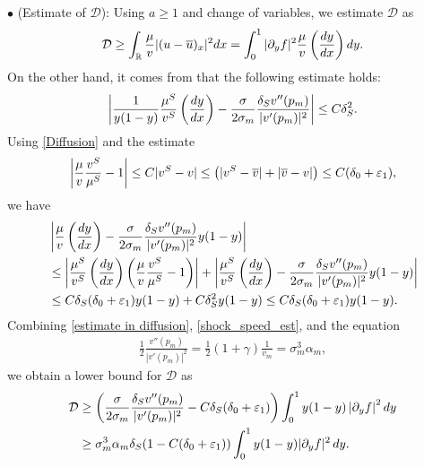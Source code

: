 \documentclass[11pt,reqno]{amsart}
\begin{document}
	
	\noindent $\bullet$ (Estimate of $\mathcal{D}$):
	Using $a \geq 1$ and change of variables, we estimate $\mathcal{D}$ as
	\begin{equation*}
	\mathcal{D} \geq  \int_{\mathbb{R}} \frac{\mu}{v}|(u-\overline{u})_x|^2 dx=\int_0^1 |\partial_y f|^2 \frac{\mu}{v} \left(\frac{dy}{d x} \right) dy.
	\end{equation*}
	On the other hand, it comes from \cite[Appendix A]{HKKL_pre} that the following estimate holds:
	\begin{equation}\label{Diffusion}
	\left|   \frac{1}{y(1-y)} \frac{ \mu^S}{v^S} \left( \frac{dy}{dx} \right)-\frac{\sigma}{2 \sigma_m}\frac{\delta_S v''(p_m)}{ |v'(p_m)|^2 } \right| \le C \delta_S^2.
	\end{equation}
	Using \eqref{Diffusion} and the estimate
	\begin{equation*}
    \begin{aligned}
	\left| \frac{\mu}{v}\frac{v^S}{\mu^S}-1 \right| \le C |v^S-v| \le \left( |v^S-\overline{v}|+|\overline{v}-v|\right) \le C (\delta_0 + \varepsilon_1),
    \end{aligned}
	\end{equation*}
	we have
	\begin{align}
	\begin{aligned}\label{estimate in diffusion}
	&\left|\frac{\mu}{v}\left(\frac{dy}{dx}\right)-\frac{\sigma}{2\sigma_m}\frac{\delta_S v''(p_m)}{|v'(p_m)|^2}y(1-y)\right|\\
	&\le \left|\frac{\mu^S}{v^S}\left(\frac{dy}{dx}\right)\left(\frac{\mu}{v}\frac{v^S}{\mu^S}-1\right)\right|+ \left|\frac{\mu^S}{v^S}\left(\frac{dy}{dx}\right)-\frac{\sigma}{2\sigma_m}\frac{\delta_S v''(p_m)}{|v'(p_m)|^2}y(1-y)\right|\\
	&\le C\delta_S(\delta_0+\varepsilon_1)y(1-y)+C\delta_S^2y(1-y)\le C\delta_S(\delta_0+\varepsilon_1)y(1-y).
	\end{aligned}
	\end{align}
	Combining \eqref{estimate in diffusion}, \eqref{shock_speed_est}, and the equation
 \begin{align*}
	\frac{1}{2 }\frac{v''(p_m)}{|v'(p_m)|^2 }=\frac{1}{2} (1+\gamma) \frac{1}{v_m}=\sigma_m^3 \alpha_m,
	\end{align*}
 we obtain a lower bound for $\mathcal{D}$ as
	\begin{equation} \label{R1.3}
 \begin{aligned}
     \mathcal{D} 
 &\geq  \left(\frac{\sigma}{2 \sigma_m}\frac{\delta_S v''(p_m)}{ |v'(p_m)|^2 }-C\delta_S(\delta_0+\varepsilon_1) \right) \int_0^1 y(1-y) \left| \partial_y f \right|^2 dy\\
 &\ge \sigma_m^3 \alpha_m \delta_S (1-C (\delta_0 + \varepsilon_1)) \int_0^1 y(1-y) |\partial_y f|^2 \, dy.
 \end{aligned}
	\end{equation}
	
\end{document}
